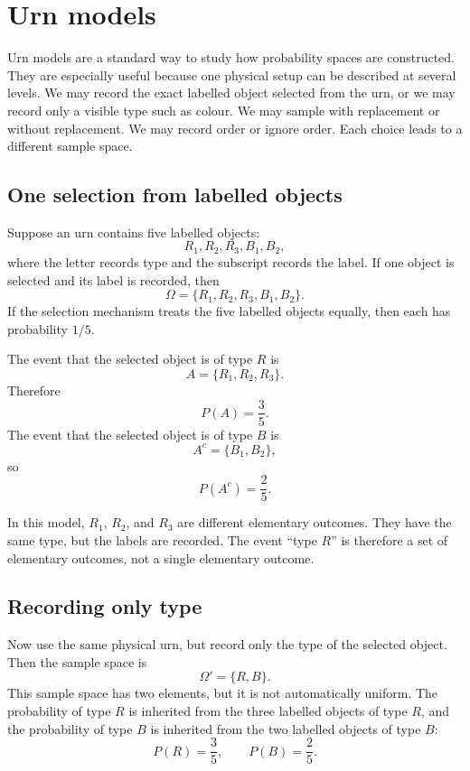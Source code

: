 \section{Urn models}

Urn models are a standard way to study how probability spaces are constructed.
They are especially useful because one physical setup can be described at
several levels. We may record the exact labelled object selected from the urn,
or we may record only a visible type such as colour. We may sample with
replacement or without replacement. We may record order or ignore order. Each
choice leads to a different sample space.

\subsection*{One selection from labelled objects}

Suppose an urn contains five labelled objects:
\[
R_1,R_2,R_3,B_1,B_2,
\]
where the letter records type and the subscript records the label. If one object
is selected and its label is recorded, then
\[
\Omega=\{R_1,R_2,R_3,B_1,B_2\}.
\]
If the selection mechanism treats the five labelled objects equally, then each
has probability \(1/5\).

The event that the selected object is of type \(R\) is
\[
A=\{R_1,R_2,R_3\}.
\]
Therefore
\[
P(A)=\frac35.
\]
The event that the selected object is of type \(B\) is
\[
A^c=\{B_1,B_2\},
\]
so
\[
P(A^c)=\frac25.
\]

\begin{remarkbox}
In this model, \(R_1\), \(R_2\), and \(R_3\) are different elementary outcomes.
They have the same type, but the labels are recorded. The event ``type \(R\)''
is therefore a set of elementary outcomes, not a single elementary outcome.
\end{remarkbox}

\subsection*{Recording only type}

Now use the same physical urn, but record only the type of the selected object.
Then the sample space is
\[
\Omega'=\{R,B\}.
\]
This sample space has two elements, but it is not automatically uniform. The
probability of type \(R\) is inherited from the three labelled objects of type
\(R\), and the probability of type \(B\) is inherited from the two labelled
objects of type \(B\):
\[
P(R)=\frac35,\qquad P(B)=\frac25.
\]

